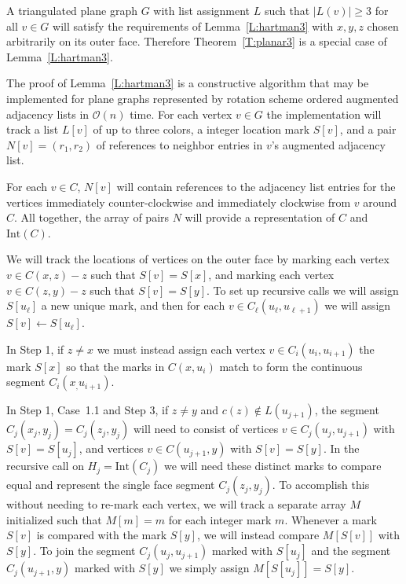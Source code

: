 \documentclass[12pt,letterpaper]{article}
\theoremstyle{plain}
\theoremstyle{definition}
\theoremstyle{break}
\begin{document}
A triangulated plane graph $G$ with list assignment $L$ such that
$|L(v)|\ge 3$ for all $v\in G$ will satisfy the requirements of
Lemma~\ref{L:hartman3} with $x,y,z$ chosen arbitrarily on its outer face.
Therefore Theorem~\ref{T:planar3} is a special case of
Lemma~\ref{L:hartman3}.

The proof of Lemma~\ref{L:hartman3} is a constructive algorithm that may be
implemented for plane graphs represented by
rotation scheme ordered augmented adjacency lists in $\mathcal{O}(n)$ time.
For each vertex $v\in G$ the implementation will track a list $L[v]$ of up to
three colors,
a integer location mark $S[v]$, and a pair $N[v]=(r_1,r_2)$ of references to
neighbor entries in $v$'s augmented adjacency list.

For each $v\in C$, $N[v]$ will contain references to the adjacency list
entries for the vertices immediately counter-clockwise and immediately clockwise
from $v$ around $C$. All together, the array of pairs $N$ will provide a
representation of $C$ and $\text{Int}(C)$.
 
We will track the locations of vertices on the outer face by marking each vertex
$v\in C(x,z)-z$ such that $S[v]=S[x]$, and marking each vertex $v\in C(z,y)-z$
such that $S[v]=S[y]$. To set up recursive calls we will assign
$S[u_\ell]$ a new unique mark, and then for each
$v\in C_{\ell}(u_\ell, u_{\ell +1})$ we will assign $S[v]\leftarrow S[u_\ell]$.

In Step 1, if $z\ne x$ we must instead
assign each vertex $v\in C_i(u_i,u_{i+1})$ the mark $S[x]$
so that the marks in $C(x,u_i)$ match to form the continuous segment
$C_i(x_,u_{i+1})$.

In Step 1, Case~1.1 and Step 3, if $z\ne y$ and $c(z)\not\in L(u_{j+1})$,
the segment $C_j(x_j,y_j)=C_j(z_j,y_j)$ will need to consist of vertices
$v\in C_j(u_j,u_{j+1})$ with $S[v]=S[u_j]$, and vertices $v\in C(u_{j+1},y)$
with $S[v]=S[y]$. In the recursive call on $H_j=\text{Int}(C_j)$ we will
need these distinct marks to compare
equal and represent the single face segment $C_j(z_j,y_j)$.
To accomplish this without needing to re-mark each vertex, we
will track a separate array $M$ initialized such that
$M[m]=m$ for each integer mark $m$.
Whenever a mark $S[v]$ is compared with the mark $S[y]$, we will
instead compare
$M[S[v]]$ with $S[y]$. To join the segment $C_j(u_j,u_{j+1})$ marked with
$S[u_j]$ and the segment $C_j(u_{j+1},y)$ marked with $S[y]$ we simply
assign $M[S[u_j]]=S[y]$.
\end{document}
